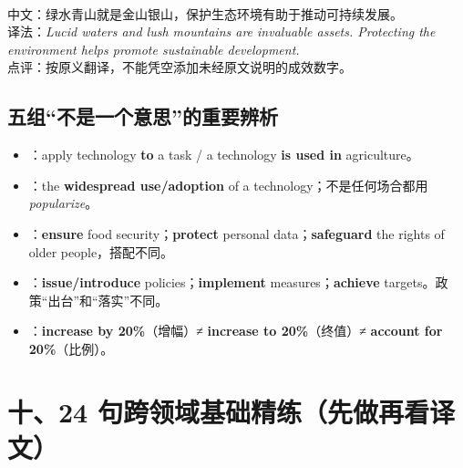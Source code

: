 \documentclass[a4paper,11pt,UTF8,fontset=none]{ctexart}
\begin{document}
\\ 中文：绿水青山就是金山银山，保护生态环境有助于推动可持续发展。\\ 译法：{\itshape Lucid waters and lush mountains are invaluable assets. Protecting the environment helps promote sustainable development.}\\ 点评：按原义翻译，不能凭空添加未经原文说明的成效数字。\par

\subsection{五组“不是一个意思”的重要辨析}

\begin{itemize}[leftmargin=1.7em,itemsep=1pt,parsep=0pt,topsep=2pt]
\item {}：apply technology {\bfseries to} a task / a technology {\bfseries is used in} agriculture。\par


\item {}：the {\bfseries widespread use/adoption} of a technology；不是任何场合都用 {\itshape popularize}。\par


\item {}：{\bfseries ensure} food security；{\bfseries protect} personal data；{\bfseries safeguard} the rights of older people，搭配不同。\par


\item {}：{\bfseries issue/introduce} policies；{\bfseries implement} measures；{\bfseries achieve} targets。政策“出台”和“落实”不同。\par


\item {}：{\bfseries increase by 20\%}（增幅）≠ {\bfseries increase to 20\%}（终值）≠ {\bfseries account for 20\%}（比例）。\par


\end{itemize}

\section{十、24 句跨领域基础精练（先做再看译文）}
\end{document}
